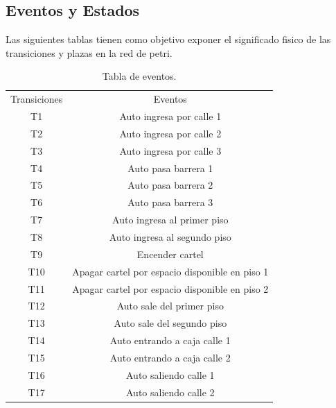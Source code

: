 \documentclass{article}
\begin{document}
	\subsection{Eventos y Estados}
	Las siguientes tablas tienen como objetivo exponer el significado fisico de las transiciones y plazas en la red de petri.
	\begin{table}[H]
		\begin{center}
		\begin{tabular}{ |c|c| } 
 			\hline
 			Transiciones & Eventos \\ 
 			T1 & Auto ingresa por calle 1 \\
 			T2 & Auto ingresa por calle 2 \\
 			T3 & Auto ingresa por calle 3 \\
 			T4 & Auto pasa barrera 1 \\
 			T5 & Auto pasa barrera 2 \\
 			T6 & Auto pasa barrera 3 \\ 
 			T7 & Auto ingresa al primer piso \\
 			T8 & Auto ingresa al segundo piso \\
 			T9 & Encender cartel \\
 			T10 & Apagar cartel por espacio disponible en piso 1 \\
 			T11 & Apagar cartel por espacio disponible en piso 2 \\
 			T12 & Auto sale del primer piso \\
 			T13 & Auto sale del segundo piso \\
 			T14 & Auto entrando a caja calle 1 \\
 			T15 & Auto entrando a caja calle 2 \\
 			T16 & Auto saliendo calle 1\\
 			T17 & Auto saliendo calle 2 \\ 
 			\hline
		\end{tabular}
		\end{center}
		\caption{Tabla de eventos.}
		\label{table:eventos}
	\end{table}
	
\end{document}
